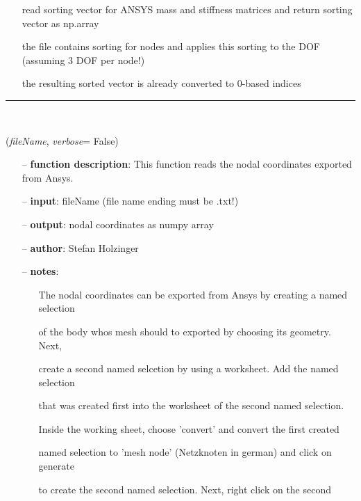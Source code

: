 \begin{itemize}[leftmargin=1.4cm]
\begin{itemize}[leftmargin=1.4cm]
\begin{itemize}[leftmargin=0.5cm]
\begin{itemize}[leftmargin=1.4cm]
\begin{itemize}[leftmargin=1.4cm]
\begin{itemize}[leftmargin=0.5cm]
\begin{itemize}[leftmargin=0.7cm]
\begin{itemize}[leftmargin=1.2cm]
\setlength{\itemindent}{-0.7cm}
\item[]read sorting vector for ANSYS mass and stiffness matrices and return sorting vector as np.array
\item[]the file contains sorting for nodes and applies this sorting to the DOF (assuming 3 DOF per node!)
\item[]the resulting sorted vector is already converted to 0-based indices
\end{itemize}
\vspace{12pt}\end{itemize}
%
\noindent\rule{8cm}{0.75pt}\vspace{1pt} \\ 
\begin{flushleft}
\label{sec:FEM:ReadNodalCoordinatesFromAnsysTxt}
({\it fileName}, {\it verbose}= False)
\end{flushleft}
\setlength{\itemindent}{0.7cm}
\begin{itemize}[leftmargin=0.7cm]
\item[--]
{\bf function description}: This function reads the nodal coordinates exported from Ansys.
\item[--]
{\bf input}: fileName (file name ending must be .txt!)
\item[--]
{\bf output}: nodal coordinates as numpy array
\item[--]
{\bf author}: Stefan Holzinger
\item[--]
{\bf notes}: \vspace{-6pt}
\begin{itemize}[leftmargin=1.2cm]
\setlength{\itemindent}{-0.7cm}
\item[]The nodal coordinates can be exported from Ansys by creating a named selection
\item[]of the body whos mesh should to exported by choosing its geometry. Next,
\item[]create a second named selcetion by using a worksheet. Add the named selection
\item[]that was created first into the worksheet of the second named selection.
\item[]Inside the working sheet, choose 'convert' and convert the first created
\item[]named selection to 'mesh node' (Netzknoten in german) and click on generate
\item[]to create the second named selection. Next, right click on the second

\end{itemize}
\end{itemize}
\end{itemize}
\end{itemize}
\end{itemize}
\end{itemize}
\end{itemize}
\end{itemize}
